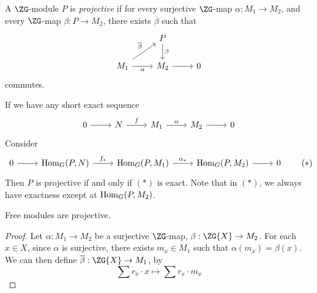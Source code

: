 \documentclass{article}
\begin{document}
\begin{definition}
    [projective]
    A \(\ZG\)-module \(P\) is \emph{projective} if for every surjective \(\ZG\)-map \(\alpha : M_1 \to M_2\), and every \(\ZG\)-map \(\beta : P \to M_2\), there exists \(\overline\beta\) such that
    \[\begin{tikzcd}
        & P \\
        {M_1} & {M_2} & 0
        \arrow["\alpha"', from=2-1, to=2-2]
        \arrow[from=2-2, to=2-3]
        \arrow["\beta", from=1-2, to=2-2]
        \arrow["\overline\beta", from=2-1, to=1-2]
    \end{tikzcd}\]
    commutes.
\end{definition}
If we have any short exact sequence
\[\begin{tikzcd}
	0 & N & {M_1} & {M_2} & 0
	\arrow[from=1-1, to=1-2]
	\arrow["f", from=1-2, to=1-3]
	\arrow["\alpha", from=1-3, to=1-4]
	\arrow[from=1-4, to=1-5]
\end{tikzcd}\]
Consider
\[\begin{tikzcd}
	0 & {\Hom_G(P, N)} & {\Hom_G(P, M_1)} & {\Hom_G(P, M_2)} & 0
	\arrow[from=1-1, to=1-2]
	\arrow["{f_*}", from=1-2, to=1-3]
	\arrow["{\alpha_*}", from=1-3, to=1-4]
	\arrow[from=1-4, to=1-5]
\end{tikzcd} \tag{\(*\)}\]
Then \(P\) is projective if and only if \((*)\) is exact. Note that in \((*)\), we always have exactness except at \(\operatorname{Hom}_G(P, M_2)\).

\lec

\begin{lemma}
    Free modules are projective.
\end{lemma}

\begin{proof}
    Let \(\alpha : M_1 \to M_2\) be a surjective \(\ZG\)-map, \(\beta : \ZG\{X\} \to M_2\). For each \(x \in X\), since \(\alpha\) is surjective, there exists \(m_x \in M_1\) such that \(\alpha(m_x) = \beta(x)\). We can then define \(\overline\beta : \ZG\{X\} \to M_1\), by
    \[\sum r_x \cdot x \mapsto \sum r_x \cdot m_x\]
\end{proof}
\end{document}
